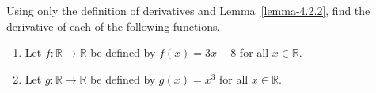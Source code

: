 \begin{exercise}
	\label{exercise-4.2.1}
	Using only the definition of derivatives and Lemma~\ref{lemma-4.2.2}, find the derivative of each of the following functions.
	\begin{enumerate}
		\item Let $f:\mathbb{R}\to\mathbb{R}$ be defined by $f(x)=3x-8$ for all $x\in\mathbb{R}$.
		\item Let $g:\mathbb{R}\to\mathbb{R}$ be defined by $g(x)=x^3$ for all $x\in\mathbb{R}$.
	\end{enumerate}
\end{exercise}
